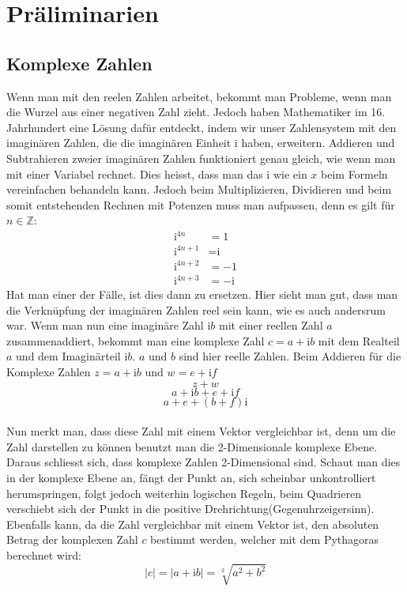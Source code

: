 \section{Präliminarien}
\subsection{Komplexe Zahlen}
Wenn man mit den reelen Zahlen arbeitet, bekommt man Probleme, wenn man die Wurzel aus einer negativen Zahl zieht. Jedoch haben Mathematiker im 16. Jahrhundert eine Lösung dafür entdeckt, indem wir unser Zahlensystem mit den imaginären Zahlen, die die imaginären Einheit i haben, erweitern. Addieren und Subtrahieren zweier imaginären Zahlen funktioniert genau gleich, wie wenn man mit einer Variabel rechnet. Dies heisst, dass man das i wie ein $x$ beim Formeln vereinfachen behandeln kann. Jedoch beim Multiplizieren, Dividieren und beim somit entstehenden Rechnen mit Potenzen muss man aufpassen, denn es gilt für $n \in \mathbb{Z}$:
\begin{align*}
 \text{i}^{4n} &= 1 \\
\text{i}^{4n+1} &= \text{i} \\
\text{i}^{4n+2} &= -1 \\
\text{i}^{4n+3} &= -\text{i} 
\end{align*}
Hat man einer der Fälle, ist dies dann zu ersetzen. Hier sieht man gut, dass man die Verknüpfung der imaginären Zahlen reel sein kann, wie es auch andersrum war. Wenn man nun eine imaginäre Zahl $\text{i}b$ mit einer reellen Zahl $a$ zusammenaddiert, bekommt man eine komplexe Zahl  $c=a+\text{i}b$ mit dem Realteil $a$ und dem Imaginärteil $\text{i}b$. $a$ und $b$ sind hier reelle Zahlen. Beim Addieren für die Komplexe Zahlen $z=a+\text{i}b$ und $w=e+\text{i}f$
\[z+w\]
\[a+\text{i}b+e+\text{i}f\]
\[a+e+(b+f)\text{i}\]
\\
Nun merkt man, dass diese Zahl mit einem Vektor vergleichbar ist, denn um die Zahl darstellen zu können benutzt man die 2-Dimensionale komplexe Ebene. Daraus schliesst sich, dass komplexe Zahlen 2-Dimensional sind. Schaut man dies in der komplexe Ebene an, fängt der Punkt an, sich scheinbar unkontrolliert herumspringen, folgt jedoch weiterhin logischen Regeln, beim Quadrieren verschiebt sich der Punkt in die positive Drehrichtung(Gegenuhrzeigersinn). Ebenfalls kann, da die Zahl vergleichbar mit einem Vektor ist, den absoluten Betrag der komplexen Zahl $c$ bestimmt werden, welcher mit dem Pythagoras berechnet wird:
\[|c| = |a+\text{i}b| = \sqrt[2]{a^2+b^2} \]

